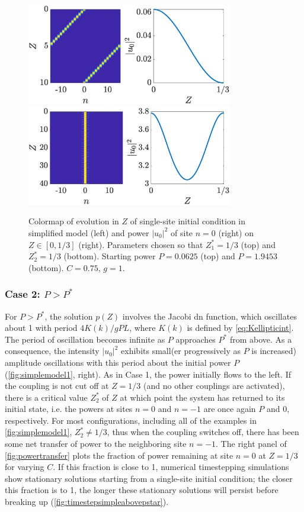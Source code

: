 \documentclass[reprint, amsmath,amssymb,aps,pre]{revtex4-2}
\begin{document}
\begin{figure}
    \centering
    \includegraphics[width=9cm]{leftsimplifiedcomplete}
    \includegraphics[width=9cm]{statsimplifiedcomplete}
    \caption{Colormap of evolution in $Z$ of single-site initial condition in simplified model (left) and power $|u_0|^2$ of site $n=0$ (right) on $Z\in[0,1/3]$ (right). Parameters chosen so that $Z_1^* = 1/3$ (top) and $Z_2^*=1/3$ (bottom).
    Starting power $P=0.0625$ (top) and $P=1.9453$ (bottom).
    $C=0.75$, $g=1$.}
    \label{fig:simplecomplete}
\end{figure}

\subsubsection{\texorpdfstring{Case 2: $P > P^*$}{Case 1: P > Pstar}}

For $P > P^*$, the solution $p(Z)$ involves the Jacobi dn function, which oscillates about 1 with period $4 K(k)/gPL$, where $K(k)$ is defined by \cref{eq:Kellipticint}. The period of oscillation becomes infinite as $P$ approaches $P^*$ from above.
As a consequence, the intensity $|u_0|^2$ exhibits small(er progressively
as $P$ is increased) amplitude oscillations with this period about the initial power $P$ (\cref{fig:simplemodel1}, right).
As in Case 1, the power initially flows to the left.
If the coupling is not cut off at $Z=1/3$ (and no other couplings are activated), there is a critical value $Z_2^*$ of $Z$ at which point the system has returned to its initial state, i.e. the powers at sites $n=0$ and $n=-1$ are once again $P$ and 0, respectively. 
For most configurations, including all of the examples in \cref{fig:simplemodel1}, $Z_2^* \neq 1/3$, thus when the coupling switches off, there has been some net transfer of power to the neighboring site $n=-1$. 
The right panel of \cref{fig:powertransfer} plots the fraction of power remaining at site $n=0$ at $Z=1/3$ for varying $C$. If this fraction is close to 1, numerical timestepping simulations show stationary solutions starting from a single-site initial condition; the closer this fraction is to 1, the longer these stationary solutions will persist before breaking up (\cref{fig:timestepsimpleabovepstar}).
\end{document}
